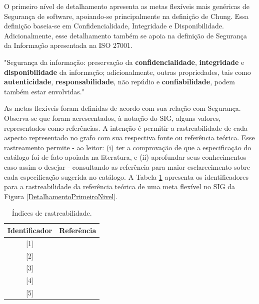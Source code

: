 O primeiro nível de detalhamento apresenta as metas flexíveis mais genéricas de Segurança de software, apoiando-se principalmente na definição de Chung. Essa definição baseia-se em Confidencialidade, Integridade e Disponibilidade. Adicionalmente, esse detalhamento também se apoia na definição de Segurança da Informação apresentada na ISO 27001. 

\begin{citacao}
	"Segurança da informação: preservação da \textbf{confidencialidade}, \textbf{integridade} e \textbf{disponibilidade} da informação; adicionalmente, outras propriedades, tais como \textbf{autenticidade}, \textbf{responsabilidade}, não repúdio e \textbf{confiabilidade}, podem também estar envolvidas." \cite[p. 2]{documentation2005information}
\end{citacao}


As metas flexíveis foram definidas de acordo com sua relação com Segurança. Observa-se que foram acrescentados, à notação do SIG, alguns valores, representados como referências. A intenção é permitir a rastreabilidade de cada aspecto representado no grafo com sua respectiva fonte ou referência teórica. Esse rastreamento permite - ao leitor: (i) ter a comprovação de que a especificação do catálogo foi de fato apoiada na literatura, e (ii) aprofundar seus conhecimentos - caso assim o desejar - consultando as referência para maior esclarecimento sobre cada especificação sugerida no catálogo. A Tabela \ref{indicesDeReferencia} apresenta os identificadores para a rastreabilidade da referência teórica de uma meta flexível no SIG da Figura \ref{DetalhamentoPrimeiroNivel}. 

\pagebreak

\begin{table}[h!]
	\centering
	\caption{Índices de rastreabilidade.}
	\label{indicesDeReferencia}
	\begin{tabular}{@{}cc@{}}
		\toprule
		\textbf{Identificador} & \textbf{Referência} \\ \midrule
		{[}1{]} & \cite{chung2012non} \\ 
		{[}2{]} & \cite{benitti2015taxonomia} \\
		{[}3{]} & \cite{documentation2005information} \\
		{[}4{]} & \cite{affleck2012supporting} \\
		{[}5{]} & \cite{buschmann1996system}
		\\ \bottomrule
	\end{tabular}
\end{table} 


